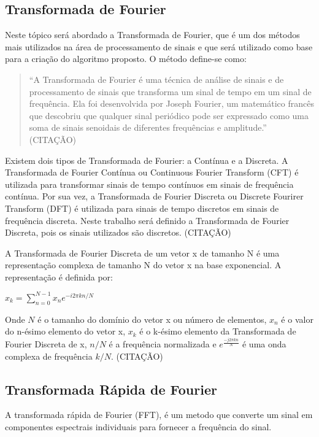 \documentclass{sbrt}
\begin{document}
\subsection{Transformada de Fourier}

Neste tópico será abordado a Transformada de Fourier, que é um dos métodos mais utilizados na área de processamento de
sinais e que será utilizado como base para a criação do algoritmo proposto. O método define-se como:


\begin{quote}
  “A Transformada de Fourier é uma técnica de análise de sinais e de processamento de sinais que transforma um sinal de
  tempo em um sinal de frequência. Ela foi desenvolvida por Joseph Fourier, um matemático francês que descobriu que
  qualquer sinal periódico pode ser expressado como uma soma de sinais senoidais de diferentes frequências e amplitude.” (CITAÇÃO)
\end{quote}

Existem dois tipos de Transformada de Fourier: a Contínua e a Discreta. A Transformada de Fourier Contínua ou Continuous
Fourier Transform (CFT) é utilizada para transformar sinais de tempo contínuos em sinais de frequência contínua. Por sua
vez, a Transformada de Fourier Discreta ou Discrete Fourirer Transform (DFT) é utilizada para sinais de tempo discretos
em sinais de frequência discreta. Neste trabalho será definido a Transformada de Fourier Discreta, pois os sinais
utilizados são discretos. (CITAÇÃO)

A Transformada de Fourier Discreta de um vetor x de tamanho N é uma representação complexa de tamanho N do vetor x na
base exponencial. A representação é definida por:

\begin{center}
  $x_k = \sum_{n=0}^{N-1} x_n e^{-i 2\pi kn/N}$
\end{center}

Onde $N$ é o tamanho do domínio do vetor x ou número de elementos, $x_n$ é o valor do n-ésimo elemento do vetor x, $x_k$
é o k-ésimo elemento da Transformada de Fourier Discreta de x, $n/N$ é a frequência normalizada e $e^{\frac{-j 2 \pi k
        n}{N}}$ é uma onda complexa de frequência $k/N$. (CITAÇÃO)

\subsection{Transformada Rápida de Fourier}

A transformada rápida de Fourier (FFT), é um metodo que  converte um sinal em componentes espectrais individuais para
fornecer a frequência do sinal.
\end{document}
